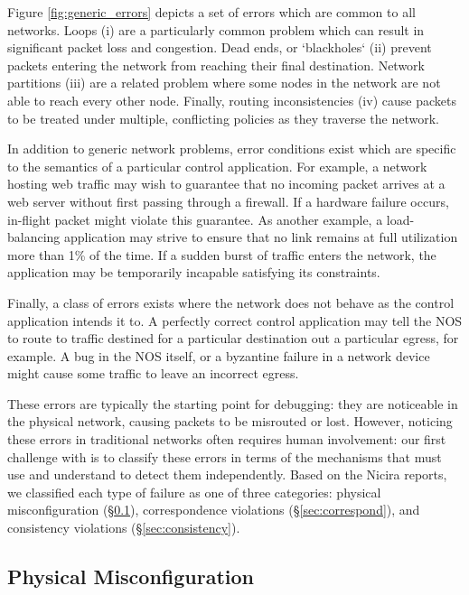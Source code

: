 Figure \ref{fig:generic_errors} depicts a set of errors which are
common to all networks. Loops (i) are a particularly common problem which
can result in significant packet loss and congestion. Dead ends, or
`blackholes` (ii) prevent packets entering the network from reaching their
final destination. Network partitions (iii) are a related problem where
some nodes in the network are not able to reach every other node. Finally, routing
inconsistencies (iv) cause packets to be treated under multiple, conflicting policies as
they traverse the network. 

In addition to generic network problems, error conditions exist which are
specific to the semantics of a particular control application. For example, a network
hosting web traffic may wish to guarantee that no incoming packet arrives
at a web server without first passing through a firewall. If a hardware
failure occurs, in-flight packet might violate this guarantee. As another
example, a load-balancing application may strive to ensure that no link
remains at full utilization more than 1\% of the time. If a sudden burst of
traffic enters the network, the application may be temporarily incapable
satisfying its constraints. 

Finally, a class of errors exists where the network does not behave as the
control application intends it to. A perfectly correct control application may
tell the NOS to route to traffic destined for a particular destination
out a particular egress, for example. A bug in the NOS itself, or a byzantine
failure in a network device might cause some traffic to leave an incorrect
egress.


These errors are typically the starting point for debugging: they are noticeable in the 
physical network, causing packets to be misrouted or lost.
However, noticing these errors in traditional networks often requires human involvement: our first challenge 
with \projectname{} is to classify these errors in terms of the mechanisms that \projectname{} must use and
understand to detect them independently.
Based on the Nicira reports, we classified each type of failure as one of three categories: physical misconfiguration (\S\ref{sec:dynamicmisconf}), correspondence violations (\S\ref{sec:correspond}), and consistency violations (\S\ref{sec:consistency}).


\subsection{Physical Misconfiguration}
\label{sec:dynamicmisconf}

